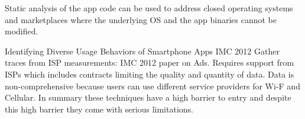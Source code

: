 Static analysis of the app code can be used to address closed operating systems and marketplaces where the underlying OS and the app binaries cannot be modified. 



{Identifying Diverse Usage Behaviors of Smartphone Apps} {IMC 2012} 
        Gather traces from ISP measurements: IMC 2012 paper on Ads.
Requires
support from ISPs which includes contracts limiting the quality and
quantity of
data. Data is non-comprehensive because users can use different service
providers for Wi-F and Cellular.
    In summary these techniques have a high barrier to entry and despite
this
high barrier they come with serious limitations. 






